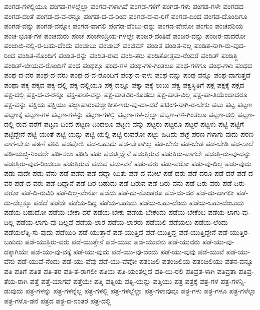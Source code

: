 {ಪಂಗಡ-ಗಳಲ್ಲಿಯೂ
ಪಂಗಡ-ಗಳಲ್ಲೆಲ್ಲಾ
ಪಂಗಡ-ಗಳಾಗಿವೆ
ಪಂಗಡ-ಗಳಿಗೆ
ಪಂಗಡ-ಗಳು
ಪಂಗಡ-ಗಳೇ
ಪಂಗಡದ
ಪಂಗಡ-ದಂತೆ
ಪಂಗಡ-ದ-ವ-ರನ್ನೂ
ಪಂಗಡ-ದ-ವ-ರಿಂದ
ಪಂಗಡ-ದ-ವ-ರಿಗೆ
ಪಂಗಡ-ದಿಂದ
ಪಂಗಡ-ದೊಂದಿಗೂ
ಪಂಗಡ-ವನ್ನು
ಪಂಗಡ-ವನ್ನೋ
ಪಂಗಡ-ವಾಗಲಿ
ಪಂಗಡ-ವೆಂಬು-ದನ್ನು
ಪಂಗಡ-ವೇನೋ
ಪಂಗುಂ
ಪಂಚದಶಿಯ
ಪಂಚ-ಭೂತ-ಗಳ
ಪಂಚಮರು
ಪಂಚೆ
ಪಂಚೇಂದ್ರಿಯ-ಗಳಲ್ಲೇ
ಪಂಜರ-ದಂತಿವೆ
ಪಂಜರ-ವನ್ನು
ಪಂಜರ-ವಾದರೋ
ಪಂಜಾಬಿ-ನಲ್ಲಿ-ರ-ಬಹು-ದೆಂದು
ಪಂಜಾಬು
ಪಂಜಾಬ್
ಪಂಜಿಮ್
ಪಂಡಿತ
ಪಂಡಿತ-ನಲ್ಲ
ಪಂಡಿತ-ನಾಗಿ-ರು-ವುದ-ರಿಂದ
ಪಂಡಿತ-ನೊಂದಿಗೆ
ಪಂಡಿತ-ರನ್ನು
ಪಂಡಿತ-ರಾದ
ಪಂಡಿ-ತರು
ಪಂಡಿತೋತ್ತಮ-ರೆಂದರೆ
ಪಂಡಿತ್
ಪಂಡಿತ್ಜಿ
ಪಂಡಿತ್-ಜೀಯವ-ರೊಂದಿಗೆ
ಪಂಥ
ಪಂಥಕ್ಕೂ
ಪಂಥ-ಗಳ
ಪಂಥ-ಗಳಿ-ಗಿಂತಲೂ
ಪಂಥ-ಗಳಿಗೂ
ಪಂಥ-ಗಳು
ಪಂಥದ
ಪಂಥ-ದ-ವರ
ಪಂಥ-ದ-ವರು
ಪಂಥ-ದ-ವ-ರೊಂದಿಗೆ
ಪಂಥ-ದ-ವಳು
ಪಂಥ-ವನ್ನು
ಪಂಥ-ವನ್ನೂ
ಪಂಥ-ವಾಗುತ್ತದೆ
ಪಂಥಾ
ಪಕ್ಕ
ಪಕ್ಕದ
ಪಕ್ಕ-ದಲ್ಲಿ
ಪಕ್ಕ-ದಲ್ಲಿಯೂ
ಪಕ್ಕ-ದಲ್ಲೂ
ಪಕ್ಕಾ
ಪಕ್ಕೆ-ಲುಬು
ಪಕ್ವ
ಪಕ್ವಸ್ಥಿತಿಗೆ
ಪಕ್ಷ
ಪಕ್ಷಕ್ಕೆ
ಪಕ್ಷದ
ಪಕ್ಷ-ದಲ್ಲಿ
ಪಕ್ಷ-ದ-ವ-ರನ್ನೂ
ಪಕ್ಷ-ಪಾತ-ವನ್ನು
ಪಕ್ಷ-ಪಾತವಿರ-ಕೂಡದು
ಪಕ್ಷ-ಪಾತ-ವಿಲ್ಲ
ಪಕ್ಷ-ಪಾ-ತಿಯೆಂದಾದರೂ
ಪಕ್ಷ-ವನ್ನು
ಪಕ್ಷಿಯ
ಪಕ್ಷಿಯು
ಪಜ್ಞಾಪಾರಂಪಜ್ಞಾತೀತ-ಇರು-ವು-ದಾ-ದರೆ
ಪಟಿಂಗ-ನಾಗಿ-ರ-ಬೇಕು
ಪಟು
ಪಟ್ಟ
ಪಟ್ಟಣ
ಪಟ್ಟಣಕ್ಕೆ
ಪಟ್ಟಣ-ಗಳ
ಪಟ್ಟಣ-ಗಳನ್ನು
ಪಟ್ಟಣ-ಗಳಲ್ಲಿ
ಪಟ್ಟಣ-ಗಳ-ಲ್ಲೆಲ್ಲಾ
ಪಟ್ಟಣ-ಗಳಿ-ಗಿಂತಲೂ
ಪಟ್ಟಣ-ದಲ್ಲಿ
ಪಟ್ಟಣ-ದಲ್ಲಿ-ರುವ-ವರೆಗೆ
ಪಟ್ಟಣ-ದಿಂದ
ಪಟ್ಟಣ-ದಿಂದಲೂ
ಪಟ್ಟಣ-ವನ್ನು
ಪಟ್ಟರು
ಪಟ್ಟರೂ
ಪಟ್ಟರೆ
ಪಟ್ಟಳು
ಪಟ್ಟಿ
ಪಟ್ಟಿಗೆ
ಪಟ್ಟಿದ್ದೇನೆ
ಪಟ್ಟಿ-ಯಂತೆ
ಪಟ್ಟಿ-ಯನ್ನು
ಪಟ್ಟಿ-ಯಲ್ಲಿ
ಪಟ್ಟಿ-ರುವರೋ
ಪಟ್ಟು-ಹಿಡಿದು
ಪಟ್ಟೆ
ಪಠಣ-ಗಳಾಗು-ವುದು
ಪಠಣ-ವಾಗ-ಬೇಕು
ಪಠಣೆ
ಪಠಿಸಿ
ಪಡಪೋಸಿ
ಪಡ-ಬಹುದು
ಪಡ-ಬೇಕಾಗಿಲ್ಲ
ಪಡ-ಬೇಕು
ಪಡ-ಬೇಡ
ಪಡ-ಬೇಡಿ
ಪಡ-ಸಾಲೆ
ಪಡಿ-ಯಚ್ಚಿ-ನಿಂದಲೇ
ಪಡಿ-ಸಲು
ಪಡಿಸಿ
ಪಡು
ಪಡುತ್ತಿದ್ದೇನೆ
ಪಡುತ್ತಿರುವ
ಪಡುತ್ತಿರು-ವಾಗಲೇ
ಪಡುತ್ತಿ-ರು-ವು-ದನ್ನು
ಪಡುತ್ತಿರು-ವುದ-ರಿಂದಲೂ
ಪಡುತ್ತಿರುವೆ
ಪಡುವ
ಪಡು-ವನೆ
ಪಡು-ವರು
ಪಡು-ವರೋ
ಪಡು-ವು-ದಿಲ್ಲ
ಪಡು-ವುದು
ಪಡು-ವುದೇ
ಪಡು-ವೆನು
ಪಡೆ
ಪಡೆದ
ಪಡೆ-ದದ್ದಾ-ಯಿತು
ಪಡೆ-ದ-ಮೇಲೆ
ಪಡೆ-ದರು
ಪಡೆ-ದರೂ
ಪಡೆ-ದರೆ
ಪಡೆ-ದ-ವರ
ಪಡೆ-ದ-ವರು
ಪಡೆ-ದಿದ್ದಾನೆ
ಪಡೆ-ದಿರ-ಬಹುದು
ಪಡೆ-ದಿರುವ
ಪಡೆ-ದಿರು-ವನು
ಪಡೆ-ದಿರು-ವರು
ಪಡೆ-ದಿರು-ವರೋ
ಪಡೆ-ದಿ-ರುವಿರಿ
ಪಡೆ-ದಿಲ್ಲ-ವೇನೋ
ಪಡೆದು
ಪಡೆ-ದು-ಕೊಂಡರೂ
ಪಡೆ-ದು-ದರ
ಪಡೆ-ದು-ದಾಗಲೀ
ಪಡೆ-ದು-ದೆಲ್ಲಕ್ಕೂ
ಪಡೆದೆ
ಪಡೆದೇ
ಪಡೆಯ-ದಿದ್ದ
ಪಡೆಯ-ಬಹುದು
ಪಡೆಯ-ಬಹು-ದೆಂದು
ಪಡೆಯ-ಬಹು-ದೆಂಬುದು
ಪಡೆಯ-ಬಹುದೋ
ಪಡೆಯ-ಬೇಕಾ-ದರೆ
ಪಡೆಯ-ಬೇಕು
ಪಡೆಯ-ಬೇಕೆಂದು
ಪಡೆಯ-ಬೇಕೆಂಬ
ಪಡೆಯ-ಲಾಗು-ವು-ದಿಲ್ಲ
ಪಡೆಯ-ಲಾಗು-ವು-ದಿಲ್ಲವೆ
ಪಡೆಯ-ಲಾರ
ಪಡೆಯ-ಲಾರರು
ಪಡೆಯಲಿ
ಪಡೆಯಲು
ಪಡೆಯ-ಲೆಂದು
ಪಡೆಯಲೆತ್ನಿ-ಸು-ವುದು
ಪಡೆಯಿರಿ
ಪಡೆ-ಯುತ್ತಾನೆ
ಪಡೆ-ಯುತ್ತಿದೆ
ಪಡೆ-ಯುತ್ತಿದ್ದ
ಪಡೆ-ಯುತ್ತಿದ್ದೇನೆ
ಪಡೆ-ಯುತ್ತಿರ-ಬಹುದು
ಪಡೆ-ಯುತ್ತಿರು-ವರು
ಪಡೆ-ಯುತ್ತೇನೆ
ಪಡೆ-ಯುವ
ಪಡೆ-ಯುವನು
ಪಡೆ-ಯುವರು
ಪಡೆ-ಯು-ವು-ದಕ್ಕಾಗಿಯೇ
ಪಡೆ-ಯು-ವು-ದಕ್ಕೆ
ಪಡೆ-ಯು-ವುದು
ಪಡೆ-ಯು-ವು-ದೆಂದು
ಪಡೆ-ಯು-ವುವು
ಪಡೆ-ಯುವೆ
ಪಡೆ-ಯು-ವೆನು
ಪಡೆ-ಯುವೆ-ನೆಂದು
ಪಡೆ-ಯು-ವೆವು
ಪಡೆ-ಯು-ವೆವೋ
ಪತಂಜಲಿ
ಪತಂಜಲಿಯ
ಪತಂಜಲಿಯು
ಪತನ-ವನ್ನೂ
ಪತಿ
ಪತಿಗೆ
ಪತಿತ
ಪತಿ-ತರ
ಪತಿ-ತ-ರಾಗಲೀ
ಪತಿಯ
ಪತಿ-ಯಂತಲ್ಲದೆ
ಪತಿ-ಯಿ-ರಲಿ
ಪತಿವ್ರತ-ಳಾಗಿ
ಪತಿವ್ರತಾ
ಪತಿವ್ರ-ತೆಯ-ರಾಗಿ
ಪತ್ತೆ
ಪತ್ತೆ-ಯಾಗದೆ
ಪತ್ತೆಯೇ
ಪತ್ನಿ
ಪತ್ನಿಯ
ಪತ್ನಿ-ಯನ್ನು
ಪತ್ನಿಯು
ಪತ್ರ
ಪತ್ರಕ್ಕೆ
ಪತ್ರ-ಗಳ
ಪತ್ರ-ಗಳನ್ನಿ-ಡುವುದು
ಪತ್ರ-ಗಳನ್ನು
ಪತ್ರ-ಗಳನ್ನೆಲ್ಲ
ಪತ್ರ-ಗಳಲ್ಲಿ
ಪತ್ರ-ಗಳಲ್ಲೆಲ್ಲಾ
ಪತ್ರ-ಗಳಾವುವೂ
ಪತ್ರ-ಗಳು
ಪತ್ರ-ಗಳೂ
ಪತ್ರ-ಗಳೆಲ್ಲಾ
ಪತ್ರ-ಗಳೊ-ಡನೆ
ಪತ್ರದ
ಪತ್ರ-ದ-ನಂತರ
ಪತ್ರ-ದಲ್ಲಿ
}
